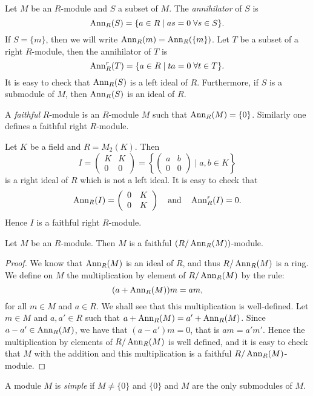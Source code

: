 Let $M$ be an $R$-module and $S$ a subset of $M$. The {\em annihilator} of $S$ is
$$\operatorname{Ann}_R(S)=\{ a\in R\mid as=0\;\forall s\in S\} .$$
If $S=\{m\}$, then we will write $\operatorname{Ann}_R(m)=\operatorname{Ann}_R(\{m\})$.
Let $T$ be a subset of a right $R$-module, then the annihilator of $T$ is
$$\operatorname{Ann}^r_R(T)=\{ a\in R\mid ta=0\;\forall t\in T\} .$$
It is easy to check that $\operatorname{Ann}_R(S)$ is a left ideal of $R$. Furthermore,
if $S$ is a submodule of $M$, then $\operatorname{Ann}_R(S)$ is an ideal of $R$.

A {\em faithful} $R$-module is an $R$-module $M$ such that $\operatorname{Ann}_R(M)=\{0\}$. Similarly one defines a faithful right $R$-module.

\begin{example}
Let $K$ be a field and $R=M_2(K)$. Then
$$I=\left(\begin{array}{cc} K&K\\
0&0\end{array}\right) =\left\{\left(\begin{array}{cc} a&b\\
0&0\end{array} \right)\mid a,b\in K\right\} $$
is a right ideal of $R$ which is not a left ideal.
It is easy to check that
$$\operatorname{Ann}_R(I)=\left(\begin{array}{cc} 0&K\\
0&K\end{array}\right)\quad\mbox{and}\quad \operatorname{Ann}^r_R(I)=0.$$
Hence $I$ is a faithful right $R$-module.
\end{example}

\begin{lemma}\label{Lema 1.1.1}
Let $M$ be an $R$-module. Then $M$ is a faithful
$(R/\operatorname{Ann}_R(M))$-module.
\end{lemma}

\begin{proof}
We know that $\operatorname{Ann}_R(M)$ is an ideal of $R$, and thus $R/\operatorname{Ann}_R(M)$ is a ring. 
We define on $M$ the multiplication by element of $R/\operatorname{Ann}_R(M)$ by the rule:
$$(a+\operatorname{Ann}_R(M))m=am,$$
for all $m\in M$ and $a\in R$. We shall see that this multiplication is well-defined.
Let $m\in M$ and $a,a'\in R$ such that $a+\operatorname{Ann}_R(M)=a'+\operatorname{Ann}_R(M)$.
Since $a-a'\in \operatorname{Ann}_R(M)$, we have that
$(a-a')m=0$, that is $am=a'm'$. Hence the multiplication by elements of $R/\operatorname{Ann}_R(M)$ is well defined, 
and it is easy to check that $M$ with the addition and this multiplication is a faithful $R/\operatorname{Ann}_R(M)$-module.
\end{proof}

A module $M$ is {\em simple} if $M\neq \{0\}$ and $\{0\}$ and $M$ are the only submodules of $M$.

